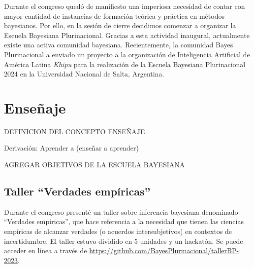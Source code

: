 \documentclass[a4paper,11pt]{book}
\theoremstyle{definition}
\begin{document}

Durante el congreso qued\'o de manifiesto una imperiosa necesidad de contar con mayor cantidad de instancias de formaci\'on te\'orica y pr\'actica en m\'etodos bayesianos.
%
Por ello, en la sesi\'on de cierre decidimos comenzar a organizar la Escuela Bayesiana Plurinacional.
%
Gracias a esta actividad inaugural, actualmente existe una activa comunidad bayesiana.
%
Recientemente, la comunidad Bayes Plurinacional a enviado un proyecto a la organizaci\'on de Inteligencia Artificial de Am\'erica Latina \emph{Khipu} para la realizaci\'on de la Escuela Bayesiana Plurinacional 2024 en la Universidad Nacional de Salta, Argentina.


\section{Ense\~naje}

DEFINICION DEL CONCEPTO ENSEÑAJE

Derivaci\'on: Aprender a (ense\~nar a aprender)

AGREGAR OBJETIVOS DE LA ESCUELA BAYESIANA

\subsection{Taller ``Verdades emp\'iricas''}

Durante el congreso present\'e un taller sobre inferencia bayesiana denominado ``Verdades emp\'iricas'', que hace referencia a la necesidad que tienen las ciencias emp\'iricas de alcanzar verdades (o acuerdos intersubjetivos) en contextos de incertidumbre.
%
El taller estuvo dividido en 5 unidades y un hackat\'on.
%
Se puede acceder en l\'inea a trav\'es de \url{https://github.com/BayesPlurinacional/tallerBP-2023}.

\end{document}

